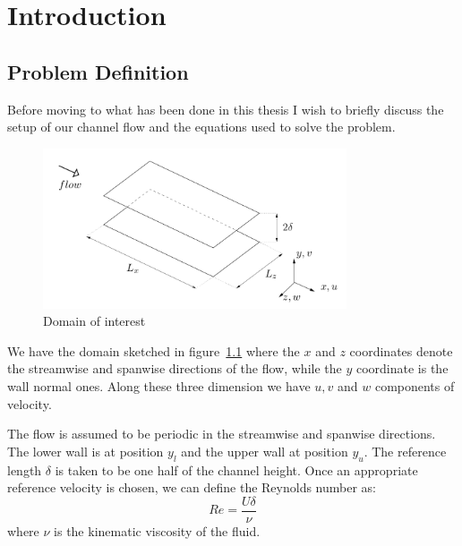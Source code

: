 \chapter{Introduction}




\section{Problem Definition}
\pagestyle{headings}

Before moving to what has been done in this thesis I wish to briefly discuss the setup of our channel flow and the equations used to solve the problem.

\begin{figure}[h]
\centering
\includegraphics[width=0.8\textwidth]{grafici/sketch_dominio}
\caption{Domain of interest}
\label{sketch_dominio}
\end{figure}

We have the domain sketched in figure~\ref{sketch_dominio} where the $x$ and $z$ coordinates denote the streamwise and spanwise directions of the flow, while the $y$ coordinate is the wall normal ones.
Along these three dimension we have $u,v$ and $w$ components of velocity.

The flow is assumed to be periodic in the streamwise and spanwise directions. The lower wall is at position $y_l$ and the upper wall at position $y_u$. The reference length $\delta$ is taken to be one half of the channel height.
Once an appropriate reference velocity is chosen, we can define the Reynolds number as:
\[
Re = \frac{U\delta}{\nu}
\]
where $\nu$ is the kinematic viscosity of the fluid.

